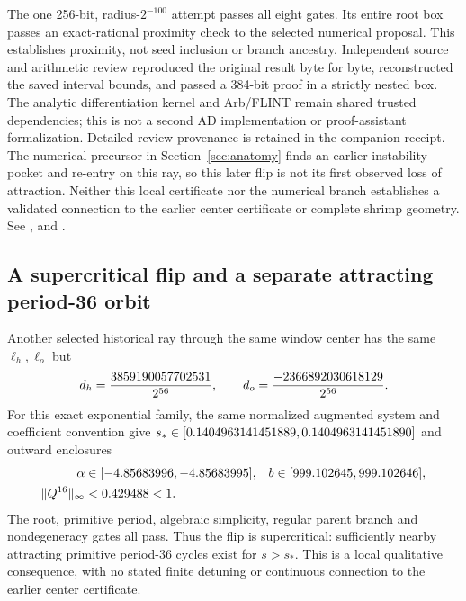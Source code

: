\documentclass[11pt,letterpaper]{article}
\begin{document}
The one 256-bit, radius-$2^{-100}$ attempt passes all eight gates. Its entire root box passes an exact-rational
proximity check to the selected numerical proposal. This establishes proximity, not seed inclusion or
branch ancestry. Independent source and arithmetic review reproduced the original result byte for byte,
reconstructed the saved interval bounds, and passed a 384-bit proof in a strictly nested box.
The analytic differentiation kernel and Arb/FLINT remain shared trusted dependencies; this is not a
second AD implementation or proof-assistant formalization. Detailed review provenance is retained in the companion receipt. The numerical precursor
in Section~\ref{sec:anatomy} finds an earlier instability pocket and re-entry on this ray, so this later flip
is not its first observed loss of attraction. Neither this local certificate nor the numerical branch
establishes a validated connection to the earlier center certificate or complete shrimp geometry.
See ,
 and
.

\subsection{A supercritical flip and a separate attracting period-36 orbit}
\label{sec:super-flip-proof}

Another selected historical ray through the same window center has the same $\ell_h,\ell_o$ but
\begin{equation}
d_h=\frac{3859190057702531}{2^{56}},\qquad d_o=\frac{-2366892030618129}{2^{56}}.
\end{equation}
For this exact exponential family, the same normalized augmented system and coefficient convention give
$s_*\in[0.1404963141451889, 0.1404963141451890]$ and outward enclosures
\begin{equation}
\begin{aligned}
\alpha&\in[-4.85683996, -4.85683995],& b&\in[999.102645, 999.102646],\\
\|Q^{16}\|_\infty&<0.429488<1.
\end{aligned}
\end{equation}
The root, primitive period, algebraic simplicity, regular parent branch and nondegeneracy gates all pass.
Thus the flip is supercritical: sufficiently nearby attracting primitive period-36 cycles exist for
$s>s_*$. This is a local qualitative consequence, with no stated finite detuning or continuous connection
to the earlier center certificate.
\end{document}
